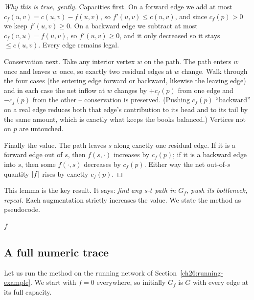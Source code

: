 \begin{proof}[Why this is true, gently]
Capacities first. On a forward edge we add at most $c_f(u,v) = c(u,v) -
f(u,v)$, so $f'(u,v) \le c(u,v)$, and since $c_f(p) > 0$ we keep $f'(u,v) \ge
0$. On a backward edge we subtract at most $c_f(v,u) = f(u,v)$, so $f'(u,v) \ge
0$, and it only decreased so it stays $\le c(u,v)$. Every edge remains legal.

Conservation next. Take any interior vertex $w$ on the path. The path enters
$w$ once and leaves $w$ once, so exactly two residual edges at $w$ change. Walk
through the four cases (the entering edge forward or backward, likewise the
leaving edge) and in each case the net inflow at $w$ changes by $+c_f(p)$ from
one edge and $-c_f(p)$ from the other -- conservation is preserved. (Pushing
$c_f(p)$ ``backward'' on a real edge reduces both that edge's contribution to
its head and to its tail by the same amount, which is exactly what keeps the
books balanced.) Vertices not on $p$ are untouched.

Finally the value. The path leaves $s$ along exactly one residual edge. If it
is a forward edge out of $s$, then $f(s,\cdot)$ increases by $c_f(p)$; if it is
a backward edge into $s$, then some $f(\cdot,s)$ decreases by $c_f(p)$. Either
way the net out-of-$s$ quantity $\lvert f\rvert$ rises by exactly $c_f(p)$.
\end{proof}

This lemma is the key result. It says: \emph{find any $s$-$t$ path in $G_f$,
push its bottleneck, repeat.} Each augmentation strictly increases the value. We
state the method as pseudocode.

\begin{algorithm}[H]
\caption{\textsc{Ford-Fulkerson}$(G, s, t)$}
\Return $f$\;
\end{algorithm}

\subsection{A full numeric trace}
\label{ch26:trace}

Let us run the method on the running network of
Section~\ref{ch26:running-example}. We start with $f = 0$ everywhere, so
initially $G_f$ is $G$ with every edge at its full capacity.

